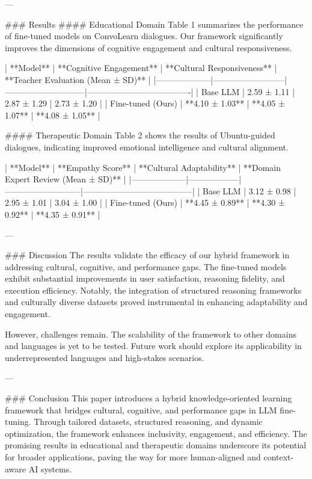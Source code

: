 ---

### Results
#### Educational Domain
Table 1 summarizes the performance of fine-tuned models on ConvoLearn dialogues. Our framework significantly improves the dimensions of cognitive engagement and cultural responsiveness.

| **Model**         | **Cognitive Engagement** | **Cultural Responsiveness** | **Teacher Evaluation (Mean ± SD)** |
|--------------------|--------------------------|-----------------------------|-------------------------------------|
| Base LLM          | 2.59 ± 1.11             | 2.87 ± 1.29                | 2.73 ± 1.20                        |
| Fine-tuned (Ours) | **4.10 ± 1.03**         | **4.05 ± 1.07**            | **4.08 ± 1.05**                    |

#### Therapeutic Domain
Table 2 shows the results of Ubuntu-guided dialogues, indicating improved emotional intelligence and cultural alignment.

| **Model**         | **Empathy Score** | **Cultural Adaptability** | **Domain Expert Review (Mean ± SD)** |
|--------------------|------------------|---------------------------|---------------------------------------|
| Base LLM          | 3.12 ± 0.98     | 2.95 ± 1.01              | 3.04 ± 1.00                          |
| Fine-tuned (Ours) | **4.45 ± 0.89** | **4.30 ± 0.92**          | **4.35 ± 0.91**                      |

---

### Discussion
The results validate the efficacy of our hybrid framework in addressing cultural, cognitive, and performance gaps. The fine-tuned models exhibit substantial improvements in user satisfaction, reasoning fidelity, and execution efficiency. Notably, the integration of structured reasoning frameworks and culturally diverse datasets proved instrumental in enhancing adaptability and engagement.

However, challenges remain. The scalability of the framework to other domains and languages is yet to be tested. Future work should explore its applicability in underrepresented languages and high-stakes scenarios.

---

### Conclusion
This paper introduces a hybrid knowledge-oriented learning framework that bridges cultural, cognitive, and performance gaps in LLM fine-tuning. Through tailored datasets, structured reasoning, and dynamic optimization, the framework enhances inclusivity, engagement, and efficiency. The promising results in educational and therapeutic domains underscore its potential for broader applications, paving the way for more human-aligned and context-aware AI systems.

